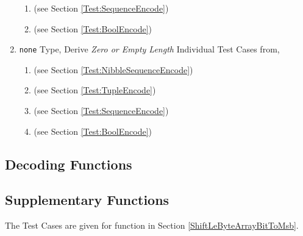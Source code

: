 \documentclass[../alan-handbook.tex]{subfiles}
\begin{document}
\begin{enumerate}
\begin{enumerate}
            \item {} (see Section \ref{Test:SequenceEncode})
            \item {} (see Section \ref{Test:BoolEncode})
        \end{enumerate}
    \item \texttt{none} Type, Derive \textit{Zero or Empty Length} Individual Test Cases from,
        \begin{enumerate}
            \item {} (see Section \ref{Test:NibbleSequenceEncode})
            \item {} (see Section \ref{Test:TupleEncode})
            \item {} (see Section \ref{Test:SequenceEncode})
            \item {} (see Section \ref{Test:BoolEncode})
        \end{enumerate}
\end{enumerate}

\subsection{Decoding Functions}

\subsection{Supplementary Functions}

 \label{Test:ShiftLeByteArrayBitToMsb}

The Test Cases are given for   function in Section \ref{ShiftLeByteArrayBitToMsb}.
\end{document}
